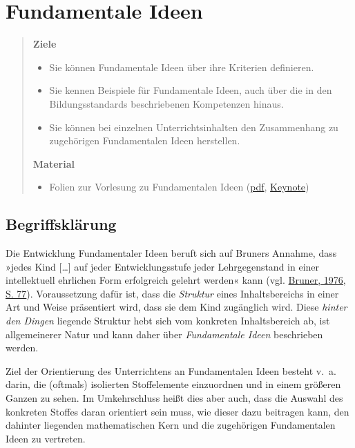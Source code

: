 \documentclass[
]{scrbook}
\providecommand{\tightlist}{%
  \setlength{\itemsep}{0pt}\setlength{\parskip}{0pt}}
\theoremstyle{definition}
\theoremstyle{definition}
\theoremstyle{definition}
\theoremstyle{definition}
\theoremstyle{remark}
\begin{document}
\hypertarget{fundamentale-ideen}{%
\chapter{Fundamentale Ideen}\label{fundamentale-ideen}}

\begin{quote}
\textbf{Ziele}

\begin{itemize}
\tightlist
\item
  Sie können Fundamentale Ideen über ihre Kriterien definieren.
\item
  Sie kennen Beispiele für Fundamentale Ideen, auch über die in den Bildungsstandards beschriebenen Kompetenzen hinaus.
\item
  Sie können bei einzelnen Unterrichtsinhalten den Zusammenhang zu zugehörigen Fundamentalen Ideen herstellen.
\end{itemize}

\textbf{Material}

\begin{itemize}
\tightlist
\item
  Folien zur Vorlesung zu Fundamentalen Ideen (\href{files/Stoffdidaktik-WiSe2223-Kap2.pdf}{pdf}, \href{files/Stoffdidaktik-WiSe2223-Kap2.key}{Keynote})
\end{itemize}
\end{quote}

\hypertarget{fundamentale-ideen-begriffsklaerung}{%
\section{Begriffsklärung}\label{fundamentale-ideen-begriffsklaerung}}

Die Entwicklung Fundamentaler Ideen beruft sich auf Bruners Annahme, dass »jedes Kind {[}\ldots{]} auf jeder Entwicklungsstufe jeder Lehrgegenstand in einer intellektuell ehrlichen Form erfolgreich gelehrt werden« kann (vgl. \protect\hyperlink{ref-Bruner:1976}{Bruner, 1976, S. 77}). Voraussetzung dafür ist, dass die \emph{Struktur} eines Inhaltsbereichs in einer Art und Weise präsentiert wird, dass sie dem Kind zugänglich wird. Diese \emph{hinter den Dingen} liegende Struktur hebt sich vom konkreten Inhaltsbereich ab, ist allgemeinerer Natur und kann daher über \emph{Fundamentale Ideen} beschrieben werden.

Ziel der Orientierung des Unterrichtens an Fundamentalen Ideen besteht v.~a. darin, die (oftmals) isolierten Stoffelemente einzuordnen und in einem größeren Ganzen zu sehen. Im Umkehrschluss heißt dies aber auch, dass die Auswahl des konkreten Stoffes daran orientiert sein muss, wie dieser dazu beitragen kann, den dahinter liegenden mathematischen Kern und die zugehörigen Fundamentalen Ideen zu vertreten.
\end{document}
